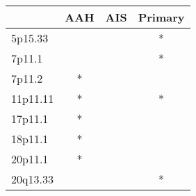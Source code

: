 \begin{tabular}{lccc}
\toprule
{} & AAH & AIS & Primary \\
\midrule
5p15.33  &     &     &       * \\
7p11.1   &     &     &       * \\
7p11.2   &   * &     &         \\
11p11.11 &   * &     &       * \\
17p11.1  &   * &     &         \\
18p11.1  &   * &     &         \\
20p11.1  &   * &     &         \\
20q13.33 &     &     &       * \\
\bottomrule
\end{tabular}
